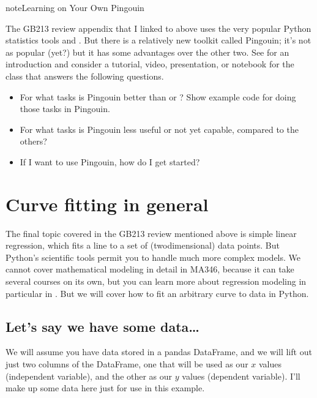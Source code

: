\documentclass[letterpaper,10pt,english]{jupyterBook}
\begin{document}
\begin{sphinxadmonition}{note}{Learning on Your Own \sphinxhyphen{} Pingouin}

\sphinxAtStartPar
The GB213 review appendix that I linked to above uses the very popular Python statistics tools  and .  But there is a relatively new toolkit called Pingouin; it’s not as popular (yet?) but it has some advantages over the other two.  See  for an introduction and consider a tutorial, video, presentation, or notebook for the class that answers the following questions.
\begin{itemize}
\item {} 
\sphinxAtStartPar
For what tasks is Pingouin better than  or ?  Show example code for doing those tasks in Pingouin.

\item {} 
\sphinxAtStartPar
For what tasks is Pingouin less useful or not yet capable, compared to the others?

\item {} 
\sphinxAtStartPar
If I want to use Pingouin, how do I get started?

\end{itemize}
\end{sphinxadmonition}


\section{Curve fitting in general}
\label{\detokenize{chapter-9-math-and-stats:curve-fitting-in-general}}
\sphinxAtStartPar
The final topic covered in the GB213 review mentioned above is simple linear regression, which fits a line to a set of (two\sphinxhyphen{}dimensional) data points.  But Python’s scientific tools permit you to handle much more complex models.  We cannot cover mathematical modeling in detail in MA346, because it can take several courses on its own, but you can learn more about regression modeling in particular in .  But we will cover how to fit an arbitrary curve to data in Python.


\subsection{Let’s say we have some data…}
\label{\detokenize{chapter-9-math-and-stats:let-s-say-we-have-some-data}}
\sphinxAtStartPar
We will assume you have data stored in a pandas DataFrame, and we will lift out just two columns of the DataFrame, one that will be used as our \(x\) values (independent variable), and the other as our \(y\) values (dependent variable).  I’ll make up some data here just for use in this example.
\end{document}
